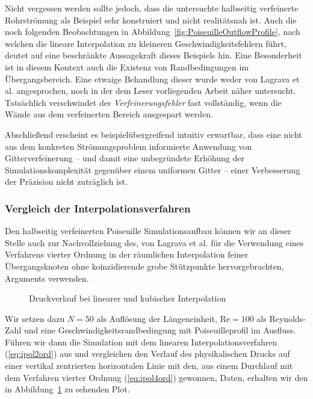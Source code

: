 Nicht vergessen werden sollte jedoch, dass die untersuchte halbseitig verfeinerte Rohrströmung als Beispiel sehr konstruiert und nicht realitätsnah ist. Auch die noch folgenden Beobachtungen in Abbildung~\ref{fig:PoiseuilleOutflowProfile}, nach welchen die lineare Interpolation zu kleineren Geschwindigkeitsfehlern führt, deutet auf eine beschränkte Aussagekraft dieses Beispiels hin.
Eine Besonderheit ist in diesem Kontext auch die Existenz von Randbedingungen im Übergangsbereich. Eine etwaige Behandlung dieser wurde weder von Lagrava et al. angesprochen, noch in der dem Leser vorliegenden Arbeit näher untersucht. Tatsächlich verschwindet der \emph{Verfeinerungsfehler} fast vollständig, wenn die Wände aus dem verfeinerten Bereich ausgespart werden.

\bigskip

Abschließend erscheint es beispielübergreifend intuitiv erwartbar, dass eine nicht aus dem konkreten Strömungsproblem informierte Anwendung von Gitterverfeinerung -- und damit eine unbegründete Erhöhung der Simulationskomplexität gegenüber einem uniformen Gitter -- einer Verbesserung der Präzision nicht zuträglich ist.

\subsubsection{Vergleich der Interpolationsverfahren}

Den halbseitig verfeinerten Poiseuille Simulationsaufbau können wir an dieser Stelle auch zur Nachvollziehung des, von Lagrava et al. für die Verwendung eines Verfahrens vierter Ordnung in der räumlichen Interpolation feiner Übergangsknoten ohne koinzidierende grobe Stützpunkte hervorgebrachten, Arguments verwenden.

\begin{figure}[h]
\begin{adjustbox}{center}

\end{adjustbox}
\caption{Druckverlauf bei linearer und kubischer Interpolation \cite[vgl.~Abb.~11]{lagrava12}}
\label{fig:PoiseuilleMassloss}
\end{figure}

Wir setzen dazu \(N=50\) als Auflösung der Längeneinheit, \(\text{Re}=100\) als Reynolds-Zahl und eine Geschwindigkeitsrandbedingung mit Poiseuilleprofil im Ausfluss. Führen wir dann die Simulation mit dem linearen Interpolationsverfahren (\ref{eq:ipol2ord}) aus und vergleichen den Verlauf des physikalischen Drucks auf einer vertikal zentrierten horizontalen Linie mit den, aus einem Durchlauf mit dem Verfahren vierter Ordnung (\ref{eq:ipol4ord}) gewonnen, Daten, erhalten wir den in Abbildung~\ref{fig:PoiseuilleMassloss} zu sehenden Plot.

